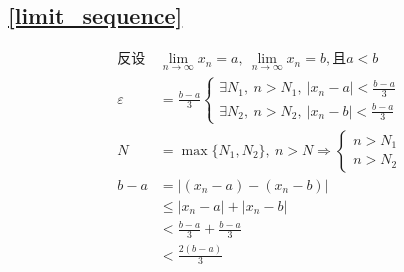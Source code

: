 \subsection{\ref{limit_sequence}}
\begin{displaymath}
    \begin{split}
        \mbox{反设}&\lim\limits_{n \to \infty}x_n =a,\ \lim\limits_{n \to \infty}x_n =b,\mbox{且}a<b\\
        \varepsilon&=\frac{b-a}{3}\begin{cases}
            \exists N_1,\ n>N_1,\ \left|x_n-a\right|<\frac{b-a}{3}\\
            \exists N_2,\ n>N_2,\ \left|x_n-b\right|<\frac{b-a}{3}
        \end{cases}\\
        N&=\max\{N_1,N_2\},\ n>N\Rightarrow\begin{cases}
            n>N_1\\
            n>N_2
        \end{cases}\\
        b-a&=\left|(x_n-a)-(x_n-b)\right|\\
        &\leqslant \left|x_n-a\right|+\left|x_n-b\right|\\
        &<\frac{b-a}{3}+\frac{b-a}{3}\\
        &<\frac{2(b-a)}{3}
    \end{split}
\end{displaymath}
